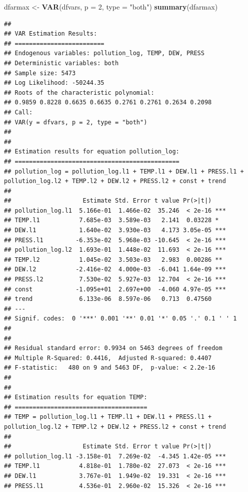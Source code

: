 \documentclass[
]{article}
\newenvironment{Shaded}{\begin{snugshade}}{\end{snugshade}}
\newcommand{\AttributeTok}[1]{\textcolor[rgb]{0.13,0.29,0.53}{#1}}
\newcommand{\DecValTok}[1]{\textcolor[rgb]{0.00,0.00,0.81}{#1}}
\newcommand{\FunctionTok}[1]{\textcolor[rgb]{0.13,0.29,0.53}{\textbf{#1}}}
\newcommand{\NormalTok}[1]{#1}
\newcommand{\OtherTok}[1]{\textcolor[rgb]{0.56,0.35,0.01}{#1}}
\newcommand{\StringTok}[1]{\textcolor[rgb]{0.31,0.60,0.02}{#1}}
\begin{document}
\begin{Shaded}
\begin{Highlighting}[]
\NormalTok{dfarmax }\OtherTok{\textless{}{-}} \FunctionTok{VAR}\NormalTok{(dfvars, }\AttributeTok{p =} \DecValTok{2}\NormalTok{, }\AttributeTok{type =} \StringTok{"both"}\NormalTok{)}
\FunctionTok{summary}\NormalTok{(dfarmax)}
\end{Highlighting}
\end{Shaded}

\begin{verbatim}
## 
## VAR Estimation Results:
## ========================= 
## Endogenous variables: pollution_log, TEMP, DEW, PRESS 
## Deterministic variables: both 
## Sample size: 5473 
## Log Likelihood: -50244.35 
## Roots of the characteristic polynomial:
## 0.9859 0.8228 0.6635 0.6635 0.2761 0.2761 0.2634 0.2098
## Call:
## VAR(y = dfvars, p = 2, type = "both")
## 
## 
## Estimation results for equation pollution_log: 
## ============================================== 
## pollution_log = pollution_log.l1 + TEMP.l1 + DEW.l1 + PRESS.l1 + pollution_log.l2 + TEMP.l2 + DEW.l2 + PRESS.l2 + const + trend 
## 
##                    Estimate Std. Error t value Pr(>|t|)    
## pollution_log.l1  5.166e-01  1.466e-02  35.246  < 2e-16 ***
## TEMP.l1           7.685e-03  3.589e-03   2.141  0.03228 *  
## DEW.l1            1.640e-02  3.930e-03   4.173 3.05e-05 ***
## PRESS.l1         -6.353e-02  5.968e-03 -10.645  < 2e-16 ***
## pollution_log.l2  1.693e-01  1.448e-02  11.693  < 2e-16 ***
## TEMP.l2           1.045e-02  3.503e-03   2.983  0.00286 ** 
## DEW.l2           -2.416e-02  4.000e-03  -6.041 1.64e-09 ***
## PRESS.l2          7.530e-02  5.927e-03  12.704  < 2e-16 ***
## const            -1.095e+01  2.697e+00  -4.060 4.97e-05 ***
## trend             6.133e-06  8.597e-06   0.713  0.47560    
## ---
## Signif. codes:  0 '***' 0.001 '**' 0.01 '*' 0.05 '.' 0.1 ' ' 1
## 
## 
## Residual standard error: 0.9934 on 5463 degrees of freedom
## Multiple R-Squared: 0.4416,  Adjusted R-squared: 0.4407 
## F-statistic:   480 on 9 and 5463 DF,  p-value: < 2.2e-16 
## 
## 
## Estimation results for equation TEMP: 
## ===================================== 
## TEMP = pollution_log.l1 + TEMP.l1 + DEW.l1 + PRESS.l1 + pollution_log.l2 + TEMP.l2 + DEW.l2 + PRESS.l2 + const + trend 
## 
##                    Estimate Std. Error t value Pr(>|t|)    
## pollution_log.l1 -3.158e-01  7.269e-02  -4.345 1.42e-05 ***
## TEMP.l1           4.818e-01  1.780e-02  27.073  < 2e-16 ***
## DEW.l1            3.767e-01  1.949e-02  19.331  < 2e-16 ***
## PRESS.l1          4.536e-01  2.960e-02  15.326  < 2e-16 ***

\end{verbatim}
\end{document}
